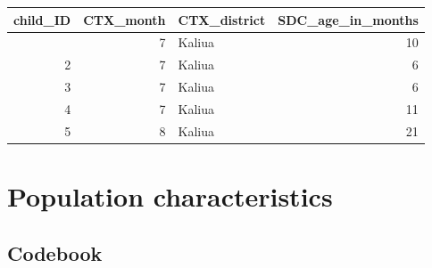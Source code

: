 \documentclass[
  letterpaper,
  DIV=11,
  numbers=noendperiod,
  oneside]{scrreprt}
\begin{document}
\begin{longtable}[]{@{}rrlr@{}}
\toprule\noalign{}
child\_ID & CTX\_month & CTX\_district & SDC\_age\_in\_months \\
\midrule\noalign{}
\endhead
\bottomrule\noalign{}
\endlastfoot
1 & 7 & Kaliua & 10 \\
2 & 7 & Kaliua & 6 \\
3 & 7 & Kaliua & 6 \\
4 & 7 & Kaliua & 11 \\
5 & 8 & Kaliua & 21 \\
\end{longtable}

\hypertarget{population-characteristics-1}{%
\section{Population
characteristics}\label{population-characteristics-1}}

\hypertarget{codebook-1}{%
\subsection{Codebook}\label{codebook-1}}
\end{document}
